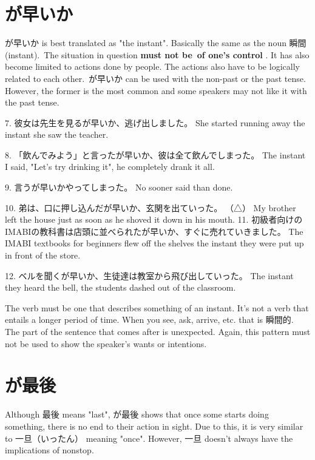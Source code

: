 \section{が早いか}
 
\par{ が早いか is best translated as "the instant". Basically the same as the noun 瞬間(instant). The situation in question \textbf{must not be of one's control }. It has also become limited to actions done by people. The actions also have to be logically related to each other. が早いか can be used with the non-past or the past tense. However, the former is the most common and some speakers may not like it with the past tense. }

\par{7. 彼女は先生を見るが早いか、逃げ出しました。 \hfill\break
She started running away the instant she saw the teacher. }

\par{8. 「飲んでみよう」と言ったが早いか、彼は全て飲んでしまった。 \hfill\break
The instant I said, "Let's try drinking it", he completely drank it all. }

\par{9. 言うが早いかやってしまった。 \hfill\break
No sooner said than done. }

\par{10. 弟は、口に押し込んだが早いか、玄関を出ていった。 （△） \hfill\break
My brother left the house just as soon as he shoved it down in his mouth. }
11. 初級者向けのIMABIの教科書は店頭に並べられたが早いか、すぐに売れていきました。 \hfill\break
The IMABI textbooks for beginners flew off the shelves the instant they were put up in front of the store. 
\par{12. ベルを聞くが早いか、生徒達は教室から飛び出していった。 \hfill\break
The instant they heard the bell, the students dashed out of the classroom. }

\par{ The verb must be one that describes something of an instant. It's not a verb that entails a longer period of time. When you see, ask, arrive, etc. that is 瞬間的. The part of the sentence that comes after is unexpected. Again, this pattern must not be used to show the speaker's wants or intentions. }
      
\section{が最後}
 
\par{ Although 最後 means "last", が最後 shows that once some starts doing something, there is no end to their action in sight. Due to this, it is very similar to 一旦（いったん） meaning "once". However, 一旦 doesn't always have the implications of nonstop. }

